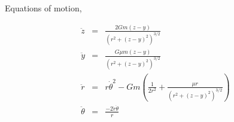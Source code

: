 \documentclass{article}
\begin{document}
Equations of motion,

\begin{eqnarray}
\ddot{z} & = & \frac{2G m (z-y)}{(r^2 + (z-y)^2)^{3/2}} \\
\ddot{y} & = & \frac{G \mu m (z-y)}{(r^2 + (z-y)^2)^{3/2}} \\
\ddot{r} & = & r\dot{\theta}^2 - Gm (\frac{1}{2r^2} + \frac{\mu r}{(r^2 + (z-y)^2)^{3/2}}) \\
\ddot{\theta} & = & \frac{-2 \dot{r} \dot{\theta}}{r} \\
\label{eq:mot}
\end{eqnarray}


%
%
%
\end{document}
